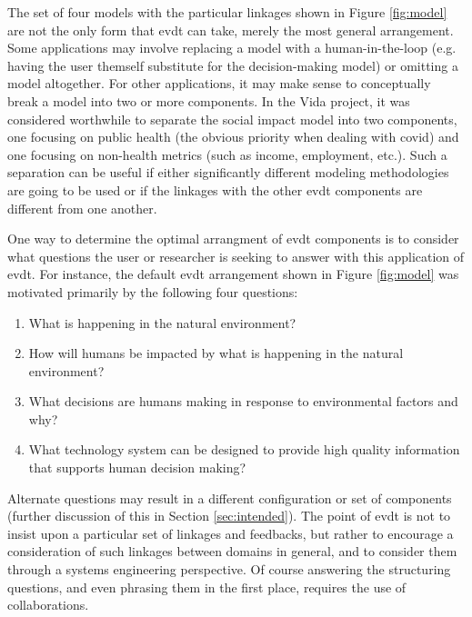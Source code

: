 The set of four models with the particular linkages shown in Figure \ref{fig:model} are not the only form that \ac{evdt} can take, merely the most general arrangement. Some applications may involve replacing a model with a human-in-the-loop (e.g. having the user themself substitute for the decision-making model) or omitting a model altogether. For other applications, it may make sense to conceptually break a model into two or more components. In the Vida project, it was considered worthwhile to separate the social impact model into two components, one focusing on public health (the obvious priority when dealing with \ac{covid}) and one focusing on non-health metrics (such as income, employment, etc.). Such a separation can be useful if either significantly different modeling methodologies are going to be used or if the linkages with the other \ac{evdt} components are different from one another. 

One way to determine the optimal arrangment of \ac{evdt} components is to consider what questions the user or researcher is seeking to answer with this application of \ac{evdt}. For instance, the default \ac{evdt} arrangement shown in Figure \ref{fig:model} was motivated primarily by the following four questions:

\begin{enumerate} \setlength{\itemsep}{0pt} \setlength{\parskip}{0pt}
    \item What is happening in the natural environment?
    \item How will humans be impacted by what is happening in the natural environment?
    \item What decisions are humans making in response to environmental factors and why?
    \item What technology system can be designed to provide high quality information that supports human decision making?
\end{enumerate}

Alternate questions may result in a different configuration or set of components (further discussion of this in Section \ref{sec:intended}). The point of \ac{evdt} is not to insist upon a particular set of linkages and feedbacks, but rather to encourage a consideration of such linkages between domains in general, and to consider them through a systems engineering perspective. Of course answering the structuring questions, and even phrasing them in the first place, requires the use of collaborations.

\subsection{} \label{sec:dss}

